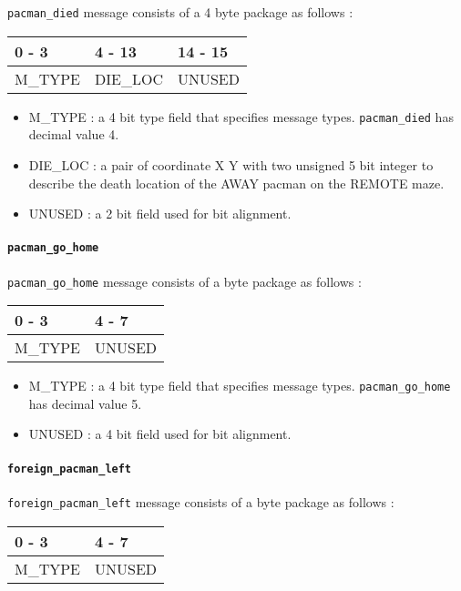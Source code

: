 \documentclass[]{article}
\let\oldparagraph\paragraph
\renewcommand{\paragraph}[1]{\oldparagraph{#1}\mbox{}}
\begin{document}
\texttt{pacman\_died} message consists of a 4 byte package as follows :

\begin{longtable}[]{@{}lll@{}}
\toprule
0 - 3 & 4 - 13 & 14 - 15\tabularnewline
\midrule
\endhead
M\_TYPE & DIE\_LOC & UNUSED\tabularnewline
\bottomrule
\end{longtable}

\begin{itemize}
\item
  M\_TYPE : a 4 bit type field that specifies message types.
  \texttt{pacman\_died} has decimal value 4.
\item
  DIE\_LOC : a pair of coordinate X Y with two unsigned 5 bit integer to
  describe the death location of the AWAY pacman on the REMOTE maze.
\item
  UNUSED : a 2 bit field used for bit alignment.
\end{itemize}

\hypertarget{pacman_go_home}{%
\paragraph{\texorpdfstring{\texttt{pacman\_go\_home}}{pacman\_go\_home}}\label{pacman_go_home}}

\texttt{pacman\_go\_home} message consists of a byte package as follows
:

\begin{longtable}[]{@{}ll@{}}
\toprule
0 - 3 & 4 - 7\tabularnewline
\midrule
\endhead
M\_TYPE & UNUSED\tabularnewline
\bottomrule
\end{longtable}

\begin{itemize}
\item
  M\_TYPE : a 4 bit type field that specifies message types.
  \texttt{pacman\_go\_home} has decimal value 5.
\item
  UNUSED : a 4 bit field used for bit alignment.
\end{itemize}

\hypertarget{foreign_pacman_left}{%
\paragraph{\texorpdfstring{\texttt{foreign\_pacman\_left}}{foreign\_pacman\_left}}\label{foreign_pacman_left}}

\texttt{foreign\_pacman\_left} message consists of a byte package as
follows :

\begin{longtable}[]{@{}ll@{}}
\toprule
0 - 3 & 4 - 7\tabularnewline
\midrule
\endhead
M\_TYPE & UNUSED\tabularnewline
\bottomrule
\end{longtable}
\end{document}
